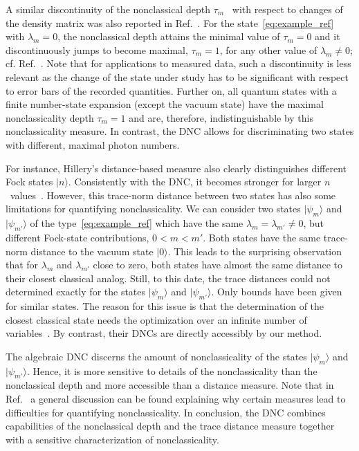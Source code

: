 \documentclass[aps,pra,twocolumn,showpacs,superscriptaddress,10pt]{revtex4-1}
\begin{document}
	A similar discontinuity of the nonclassical depth $\tau_m$~\cite{Lee1991} with respect to changes of the density matrix was also reported in Ref.~\cite{Luetkenhaus1995}.
	For the state~\eqref{eq:example_ref} with $\lambda_m=0$, the nonclassical depth attains the minimal value of $\tau_m=0$ and it discontinuously jumps to become maximal, $\tau_m=1$, for any other value of $\lambda_m\neq0$; cf. Ref.~\cite{Luetkenhaus1995}.
	Note that for applications to measured data, such a discontinuity is less relevant as the change of the state under study has to be significant with respect to error bars of the recorded quantities.
	Further on, all quantum states with a finite number-state expansion (except the vacuum state) have the maximal nonclassicality depth $\tau_m=1$ and are, therefore, indistinguishable by this nonclassicality measure.
	In contrast, the DNC allows for discriminating two states with different, maximal photon numbers.

	For instance, Hillery's distance-based measure \cite{Hillery1987a} also clearly distinguishes different Fock states $|n\rangle$.
	Consistently with the DNC, it becomes stronger for larger $n$~values~\cite{Nair2017,Vogel2014}.
	However, this trace-norm distance between two states has also some limitations for quantifying nonclassicality.
	We can consider two states $|\psi_{m}\rangle$ and $|\psi_{m'}\rangle$ of the type~\eqref{eq:example_ref} which have the same $\lambda_m=\lambda_{m'}\neq0$, but different Fock-state contributions, $0<m<m'$.
	Both states have the same trace-norm distance to the vacuum state $|0\rangle$.
	This leads to the surprising observation that for $\lambda_{m}$ and $\lambda_{m'}$ close to zero, both states have almost the same distance to their closest classical analog.
	Still, to this date, the trace distances could not determined exactly for the states $|\psi_{m}\rangle$ and $|\psi_{m'}\rangle$.
	Only bounds have been given~\cite{Nair2017} for similar states.
	The reason for this issue is that the determination of the closest classical state needs the optimization over an infinite number of variables~\cite{Asboth2005}.
	By contrast, their DNCs are directly accessibly by our method.
	
        The algebraic DNC discerns the amount of nonclassicality of the states $|\psi_m\rangle$ and $|\psi_{m'}\rangle$.
        Hence, it is more sensitive to details of the nonclassicality than the nonclassical depth and more accessible than a distance measure.
        Note that in Ref.~\cite{Sperling2015} a general discussion can be found explaining why certain measures lead to difficulties for quantifying nonclassicality.
	In conclusion, the DNC combines capabilities of the nonclassical depth and the trace distance measure together with a sensitive characterization of nonclassicality.
\end{document}
